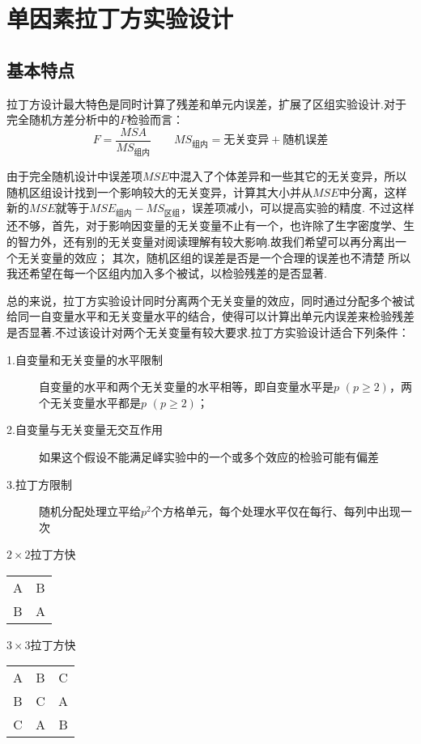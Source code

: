 \section{单因素拉丁方实验设计}

\subsection{基本特点}

拉丁方设计最大特色是同时计算了残差和单元内误差，扩展了区组实验设计.对于完全随机方差分析中的$F$检验而言：
\[ F=\frac{MSA}{MS_{\text{组内}}} \qquad MS_{\text{组内}}=\text{无关变异}+\text{随机误差} \]

由于完全随机设计中误差项$MSE$中混入了个体差异和一些其它的无关变异，所以随机区组设计找到一个影响较大的无关变异，计算其大小并从$MSE$中分离，这样新的$MSE$就等于$MSE_{\text{组内}}-MS_{\text{区组}}$，误差项减小，可以提高实验的精度.
不过这样还不够，首先，对于影响因变量的无关变量不止有一个，也许除了生字密度学、生的智力外，还有别的无关变量对阅读理解有较大影响.故我们希望可以再分离出一个无关变量的效应；
其次，随机区组的误差是否是一个合理的误差也不清楚
所以我还希望在每一个区组内加入多个被试，以检验残差的是否显著.

总的来说，拉丁方实验设计同时分离两个无关变量的效应，同时通过分配多个被试给同一自变量水平和无关变量水平的结合，使得可以计算出单元内误差来检验残差是否显著.不过该设计对两个无关变量有较大要求.拉丁方实验设计适合下列条件：

\begin{description}
\item[1.自变量和无关变量的水平限制] 自变量的水平和两个无关变量的水平相等，即自变量水平是$p$ $(p\geq 2)$，两个无关变量水平都是$p$ $(p\geq 2)$；
\item[2.自变量与无关变量无交互作用] 如果这个假设不能满足峄实验中的一个或多个效应的检验可能有偏差
\item[3.拉丁方限制]随机分配处理立平给$p^2$个方格单元，每个处理水平仅在每行、每列中出现一次
\end{description}

\begin{margintable}
  \caption{$2\times 2$拉丁方快}
    \begin{tabular}{cc}
    A     & B \\
    B     & A \\
    \end{tabular}
\end{margintable}

\begin{margintable}
  \caption{$3\times 3$拉丁方快}
    \begin{tabular}{ccc}
    A  &  B  &  C\\
    B  &  C  &  A\\
    C  &  A  &  B\\
    \end{tabular}
\end{margintable}

